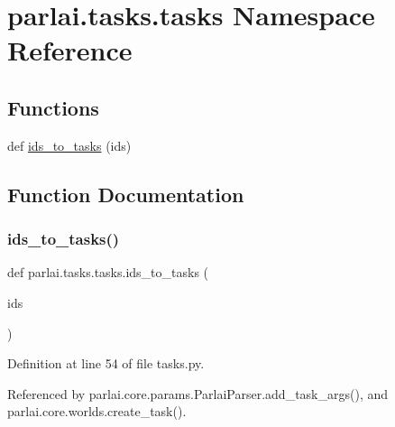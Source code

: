\hypertarget{namespaceparlai_1_1tasks_1_1tasks}{}\section{parlai.\+tasks.\+tasks Namespace Reference}
\label{namespaceparlai_1_1tasks_1_1tasks}
\subsection*{Functions}
\begin{DoxyCompactItemize}
\item 
def \hyperlink{namespaceparlai_1_1tasks_1_1tasks_ad536d1295ca5ba2ecf3a48635b482087}{ids\+\_\+to\+\_\+tasks} (ids)
\end{DoxyCompactItemize}


\subsection{Function Documentation}
\mbox{\label{namespaceparlai_1_1tasks_1_1tasks_ad536d1295ca5ba2ecf3a48635b482087}} 
\subsubsection{\texorpdfstring{ids\+\_\+to\+\_\+tasks()}{ids\_to\_tasks()}}
{\footnotesize\ttfamily def parlai.\+tasks.\+tasks.\+ids\+\_\+to\+\_\+tasks (\begin{DoxyParamCaption}\item[{}]{ids }\end{DoxyParamCaption})}



Definition at line 54 of file tasks.\+py.



Referenced by parlai.\+core.\+params.\+Parlai\+Parser.\+add\+\_\+task\+\_\+args(), and parlai.\+core.\+worlds.\+create\+\_\+task().

